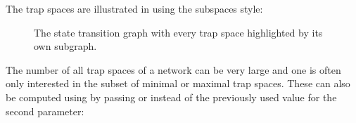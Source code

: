 \documentclass[letterpaper,10pt,english]{sphinxmanual}
\begin{document}
The trap spaces are illustrated in {\hyperref[\detokenize{Manual:figure23}]{}} using the subspaces style:

\begin{sphinxVerbatim}[commandchars=\\\{\}]
   
  
\PYG{p}{[}\PYG{p}{]}  
 
\end{sphinxVerbatim}

\begin{figure}[htbp]
\centering
\capstart

\noindent{}
\caption{The state transition graph  with every trap space highlighted by its own subgraph.}\label{\detokenize{Manual:figure23}}\label{\detokenize{Manual:id27}}\end{figure}

The number of all trap spaces of a network can be very large and one is often only interested in the subset of minimal or maximal trap spaces.
These can also be computed using {\hyperref[\detokenize{AspSolver:trap-spaces}]{}} by passing  or  instead of the previously used value  for the second parameter:
\end{document}
